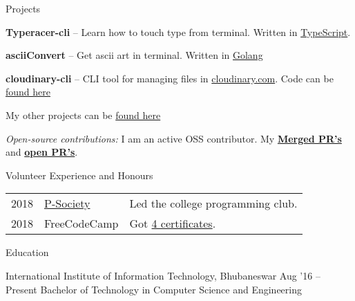 \documentclass{resume} %
\begin{document}

\begin{rSection}{Projects}
  \begin{rProjectSection}
    \item \textbf {Typeracer-cli} -- Learn how to touch type from terminal. Written in \href{https://github.com/p-society/typeracer-cli/}{TypeScript}.
    \item \textbf {asciiConvert} -- Get ascii art in terminal. Written in \href{https://github.com/knrt10/asciiConvert/}{Golang}
    \item \textbf {cloudinary-cli} -- CLI tool for managing files in \href{https://cloudinary.com/}{cloudinary.com}. Code can be \href{https://github.com/knrt10/cloudinary-cli/}{found here}
    \item My other projects can be \href{https://knrt10.github.io/projects/}{found here}
  \end{rProjectSection}

  \begin{rBlurbSection}
    \item {\em Open-source contributions:}
      I am an active OSS contributor. My \href{http://bit.ly/2kdr9Ui/}{\textbf{Merged PR's}} and \href{http://bit.ly/2kxjvV9/}{\textbf{open PR's}}.
  \end{rBlurbSection}
\end{rSection}


\begin{rSection}{Volunteer Experience and Honours}
  \begin{tabular}{rll}
2018	     & {\href{https://github.com/p-society/}{P-Society}}  & Led the college programming club.\\
2018	     & FreeCodeCamp  & Got \href{https://www.freecodecamp.org/knrt10/}{4 certificates}.\\
\end{tabular}
\end{rSection}


\begin{rSection}{Education}
  \begin{rEducationSection}{International Institute of Information Technology, Bhubaneswar}
                           {Aug '16 -- Present}
                           {Bachelor of Technology in Computer Science and Engineering}
  \end{rEducationSection}
\end{rSection}
\end{document}
